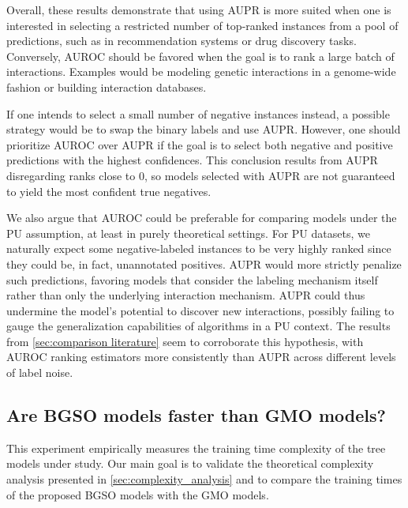 Overall, these results demonstrate that using AUPR is more suited when one is interested in selecting a restricted number of top-ranked instances from a pool of predictions, such as in recommendation systems or drug discovery tasks.
Conversely, AUROC should be favored when the goal is to rank a large batch of interactions. Examples would be modeling genetic interactions in a genome-wide fashion or building interaction databases.

If one intends to select a small number of negative instances instead, a possible strategy would be to swap the binary labels and use AUPR.
However, one should prioritize AUROC over AUPR if the goal is to select both negative and positive predictions with the highest confidences. This conclusion results from AUPR disregarding ranks close to $0$, so models selected with AUPR are not guaranteed to yield the most confident true negatives.

We also argue that AUROC could be preferable for comparing models under the PU assumption, at least in purely theoretical settings. For PU datasets, we naturally expect some negative-labeled instances to be very highly ranked since they could be, in fact, unannotated positives. AUPR would more strictly penalize such predictions, favoring models that consider the labeling mechanism itself rather than only the underlying interaction mechanism. AUPR could thus undermine the model's potential to discover new interactions, possibly failing to gauge the generalization capabilities of algorithms in a PU context. The results from \autoref{sec:comparison literature} seem to corroborate this hypothesis, with AUROC ranking estimators more consistently than AUPR across different levels of label noise.


\subsection{Are BGSO models faster than GMO models?}
\label{sec:empirical_complexity}

This experiment empirically measures the training time complexity of the tree models under study. Our main goal is to validate the theoretical complexity analysis presented in \autoref{sec:complexity_analysis} and to compare the training times of the proposed BGSO models with the GMO models.

